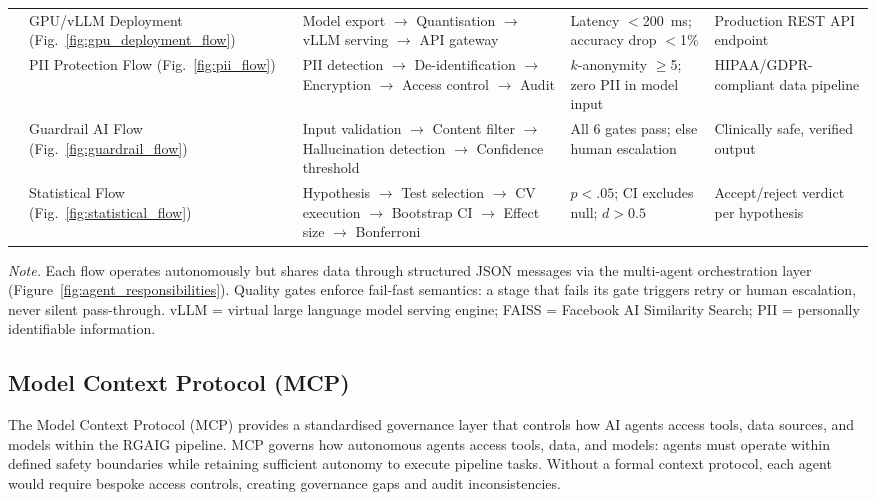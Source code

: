 {\begin{xltabular}{\textwidth}{@{} p{0.6cm} p{1.8cm} L p{2cm} L @{}}
 & GPU/vLLM Deployment (Fig.~\ref{fig:gpu_deployment_flow}) & Model export $\to$ Quantisation $\to$ vLLM serving $\to$ API gateway & Latency $<$200~ms; accuracy drop $<$1\% & Production REST API endpoint \\
 & PII Protection Flow (Fig.~\ref{fig:pii_flow}) & PII detection $\to$ De-identification $\to$ Encryption $\to$ Access control $\to$ Audit & $k$-anonymity $\geq$5; zero PII in model input & HIPAA/GDPR-compliant data pipeline \\
 & Guardrail AI Flow (Fig.~\ref{fig:guardrail_flow}) & Input validation $\to$ Content filter $\to$ Hallucination detection $\to$ Confidence threshold & All 6 gates pass; else human escalation & Clinically safe, verified output \\
 & Statistical Flow (Fig.~\ref{fig:statistical_flow}) & Hypothesis $\to$ Test selection $\to$ CV execution $\to$ Bootstrap CI $\to$ Effect size $\to$ Bonferroni & $p < .05$; CI excludes null; $d > 0.5$ & Accept/reject verdict per hypothesis \\
\end{xltabular}}
\vspace{0.5em}\noindent\textit{Note.} Each flow operates autonomously but shares data through structured JSON messages via the multi-agent orchestration layer (Figure~\ref{fig:agent_responsibilities}). Quality gates enforce fail-fast semantics: a stage that fails its gate triggers retry or human escalation, never silent pass-through. vLLM = virtual large language model serving engine; FAISS = Facebook AI Similarity Search; PII = personally identifiable information.

\subsection{Model Context Protocol (MCP)}
\label{app_sec:mcp}

The Model Context Protocol (MCP) provides a standardised governance layer that controls how AI agents access tools, data sources, and models within the RGAIG pipeline. MCP governs how autonomous agents access tools, data, and models: agents must operate within defined safety boundaries while retaining sufficient autonomy to execute pipeline tasks. Without a formal context protocol, each agent would require bespoke access controls, creating governance gaps and audit inconsistencies.

